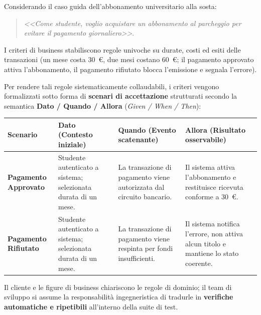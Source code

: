 \documentclass[12pt]{extarticle}
\begin{document}
\noindent Considerando il caso guida dell'abbonamento universitario alla sosta:
\begin{quote}
    \textit{<<Come studente, voglio acquistare un abbonamento al parcheggio per evitare il pagamento giornaliero>>}.
\end{quote}
I criteri di business stabiliscono regole univoche su durate, costi ed esiti delle transazioni (un mese costa 30~€, due mesi costano 60~€; il pagamento approvato attiva l'abbonamento, il pagamento rifiutato blocca l'emissione e segnala l'errore).

\noindent Per rendere tali regole sistematicamente collaudabili, i criteri vengono formalizzati sotto forma di \textbf{scenari di accettazione} strutturati secondo la semantica \textbf{Dato / Quando / Allora} (\textit{Given / When / Then}):

\begin{center}
\small
\begin{tabular}{p{2.6cm}p{3.8cm}p{3.8cm}p{4.2cm}}
    \toprule
    \textbf{Scenario} & \textbf{Dato (Contesto iniziale)} & \textbf{Quando (Evento scatenante)} & \textbf{Allora (Risultato osservabile)} \\
    \midrule
    \textbf{Pagamento Approvato} & Studente autenticato a sistema; selezionata durata di un mese. & La transazione di pagamento viene autorizzata dal circuito bancario. & Il sistema attiva l'abbonamento e restituisce ricevuta conforme a 30~€. \\
    \addlinespace
    \textbf{Pagamento Rifiutato} & Studente autenticato a sistema; selezionata durata di un mese. & La transazione di pagamento viene respinta per fondi insufficienti. & Il sistema notifica l'errore, non attiva alcun titolo e mantiene lo stato coerente. \\
    \bottomrule
\end{tabular}
\end{center}

\noindent Il cliente e le figure di business chiariscono le regole di dominio; il team di sviluppo si assume la responsabilità ingegneristica di tradurle in \textbf{verifiche automatiche e ripetibili} all'interno della suite di test.
\end{document}
